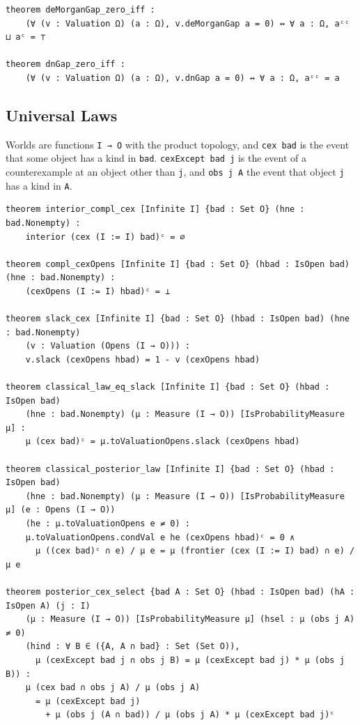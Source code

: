 \label{lean:slack-logics}
\begin{lstlisting}
theorem deMorganGap_zero_iff :
    (∀ (v : Valuation Ω) (a : Ω), v.deMorganGap a = 0) ↔ ∀ a : Ω, aᶜᶜ ⊔ aᶜ = ⊤

theorem dnGap_zero_iff :
    (∀ (v : Valuation Ω) (a : Ω), v.dnGap a = 0) ↔ ∀ a : Ω, aᶜᶜ = a
\end{lstlisting}

\subsection{Universal Laws}

Worlds are functions \lstinline{I → O} with the product topology, and
\lstinline{cex bad} is the event that some object has a kind in
\lstinline{bad}. \lstinline{cexExcept bad j} is the event of a
counterexample at an object other than \lstinline{j}, and
\lstinline{obs j A} the event that object \lstinline{j} has a kind in
\lstinline{A}.

\label{lean:ravens}
\begin{lstlisting}
theorem interior_compl_cex [Infinite I] {bad : Set O} (hne : bad.Nonempty) :
    interior (cex (I := I) bad)ᶜ = ∅

theorem compl_cexOpens [Infinite I] {bad : Set O} (hbad : IsOpen bad) (hne : bad.Nonempty) :
    (cexOpens (I := I) hbad)ᶜ = ⊥

theorem slack_cex [Infinite I] {bad : Set O} (hbad : IsOpen bad) (hne : bad.Nonempty)
    (v : Valuation (Opens (I → O))) :
    v.slack (cexOpens hbad) = 1 - v (cexOpens hbad)

theorem classical_law_eq_slack [Infinite I] {bad : Set O} (hbad : IsOpen bad)
    (hne : bad.Nonempty) (μ : Measure (I → O)) [IsProbabilityMeasure μ] :
    μ (cex bad)ᶜ = μ.toValuationOpens.slack (cexOpens hbad)

theorem classical_posterior_law [Infinite I] {bad : Set O} (hbad : IsOpen bad)
    (hne : bad.Nonempty) (μ : Measure (I → O)) [IsProbabilityMeasure μ] (e : Opens (I → O))
    (he : μ.toValuationOpens e ≠ 0) :
    μ.toValuationOpens.condVal e he (cexOpens hbad)ᶜ = 0 ∧
      μ ((cex bad)ᶜ ∩ e) / μ e = μ (frontier (cex (I := I) bad) ∩ e) / μ e

theorem posterior_cex_select {bad A : Set O} (hbad : IsOpen bad) (hA : IsOpen A) (j : I)
    (μ : Measure (I → O)) [IsProbabilityMeasure μ] (hsel : μ (obs j A) ≠ 0)
    (hind : ∀ B ∈ ({A, A ∩ bad} : Set (Set O)),
      μ (cexExcept bad j ∩ obs j B) = μ (cexExcept bad j) * μ (obs j B)) :
    μ (cex bad ∩ obs j A) / μ (obs j A)
      = μ (cexExcept bad j)
        + μ (obs j (A ∩ bad)) / μ (obs j A) * μ (cexExcept bad j)ᶜ
\end{lstlisting}

